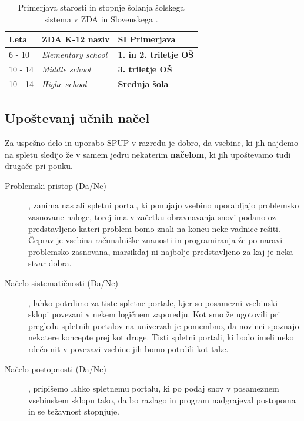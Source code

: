 \begin{table}[!h]
\caption{Primerjava starosti in stopnje šolanja šolskega sistema v ZDA
  in Slovenskega \cite{wiki:k12}.}
\label{tab:primerjava_šolski}
\begin{tabular}{
  | p{} |
  p{} |
  p{} |  }
\hline
  \rowcolor{sbase01!100}
  \textbf{Leta} & \textbf{ZDA K-12 naziv} & \textbf{SI Primerjava} \\
        \hline
      6 - 10    & \emph{Elementary school} & \textbf{1. in 2. triletje
                                             OŠ}\\
        \hline
      10 - 14    & \emph{Middle school} & \textbf{3. triletje OŠ} \\
        \hline
      10 - 14    & \emph{Highe school} & \textbf{Srednja šola} \\
  \hline
\end{tabular}
\end{table}

\subsection{Upoštevanj učnih načel}
\label{sec:upoštevanje_načel}

Za uspešno delo in uporabo SPUP v razredu je dobro, da vsebine, ki jih
najdemo na spletu sledijo že v samem jedru nekaterim \textbf{načelom}, ki jih
upoštevamo tudi drugače pri pouku. 

\begin{description}
\item[Problemski pristop (Da/Ne)], zanima nas ali spletni portal, ki
  ponujajo vsebino uporabljajo problemsko zasnovane naloge, torej ima
  v začetku obravnavanja snovi podano oz predstavljeno kateri problem
  bomo znali na koncu neke vadnice rešiti. Čeprav je vsebina
  računalniške znanosti in programiranja že po naravi problemsko
  zasnovana, marsikdaj ni najbolje predstavljeno za kaj je neka stvar
  dobra.
\item[Načelo sistematičnosti (Da/Ne)], lahko potrdimo za tiste
  spletne portale, kjer so posamezni vsebinski sklopi povezani v nekem
  logičnem zaporedju. Kot smo že ugotovili pri pregledu spletnih
  portalov na univerzah je pomembno, da novinci spoznajo nekatere
  koncepte prej kot druge. Tisti spletni portali, ki bodo imeli neko
  rdečo nit v povezavi vsebine jih bomo potrdili kot take.
\item[Načelo postopnosti (Da/Ne)], pripišemo lahko spletnemu portalu,
  ki po podaj snov v posameznem vsebinskem sklopu tako, da bo razlago
  in program nadgrajeval postopoma in se težavnost stopnjuje. 
\end{description}

